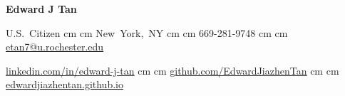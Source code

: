 \begin{header}
    \textbf{\fontsize{24pt}{24pt}\selectfont Edward J Tan}

\vspace{0.1cm}
    \normalsize
    \mbox{U.S. Citizen}%
     cm%
    \AND%
     cm%
    \mbox{New York, NY}%
     cm%
    \AND%
     cm%
    \mbox{669-281-9748}%
     cm%
    \AND%
     cm%
    \mbox{\href{mailto:etan7@u.rochester.edu}{etan7@u.rochester.edu}}%

    \vspace{-0.15 cm}

    \mbox{\underline{\href{https://linkedin.com/in/edward-j-tan}{linkedin.com/in/edward-j-tan}}}%
     cm%
    \AND%
     cm%
    \mbox{\underline{\href{https://github.com/EdwardJiazhenTan}{github.com/EdwardJiazhenTan}}}%
     cm%
    \AND%
     cm%
    \mbox{\underline{\href{https://edwardjiazhentan.github.io/}{edwardjiazhentan.github.io}}}%
    \vspace{0.2cm}
\end{header}
